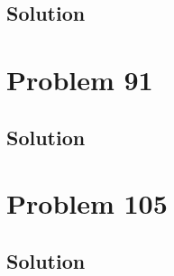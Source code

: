 \documentclass[12pt]{article}
\begin{document}
        \subsection{Solution}

    \pagebreak
    \section{Problem 91}

        \subsection{Solution}

    \pagebreak
    \section{Problem 105}

        \subsection{Solution}

    \pagebreak
    \tableofcontents
\end{document}
